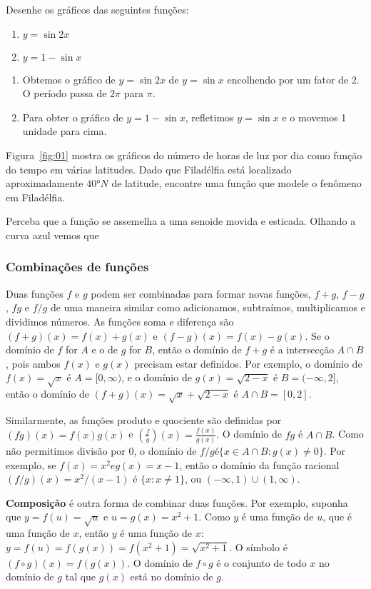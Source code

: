  Desenhe os gráficos das seguintes funções:
\begin{enumerate}
	\item $y=\sin 2x$
	\item $y=1-\sin x$
\end{enumerate}
\solution 
\begin{enumerate}
	\item Obtemos o gráfico de $y=\sin 2x$ de $y=\sin x$ encolhendo por um fator de 2. O período passa de $2\pi$ para $\pi$.
	\item Para obter o gráfico de $y=1-\sin x$, refletimos $y=\sin x$ e o movemos 1 unidade para cima.
\end{enumerate}

 Figura~\ref{fig:01} mostra os gráficos do número de horas de luz por dia como função do tempo em várias latitudes. Dado que Filadélfia está localizado aproximadamente $40\si\degree N$ de latitude, encontre uma função que modele o fenômeno em Filadélfia.

\solution Perceba que a função se assemelha a uma senoide movida e esticada. Olhando a curva azul vemos que 

\subsubsection{Combinações de funções}

Duas funções $f$ e $g$ podem ser combinadas para formar novas funções, $f+g$, $f-g$, $fg$ e $f/g$ de uma maneira similar como adicionamos, subtraímos, multiplicamos e dividimos números. As funções soma e diferença são $(f+g)(x) = f(x)+g(x)$ e $(f-g)(x)=f(x)-g(x)$. Se o domínio de $f$ for $A$ e o de $g$ for $B$, então o domínio de $f+g$ é a intersecção $A\cap B$, pois ambos $f(x)$ e $g(x)$ precisam estar definidos. Por exemplo, o domínio de $f(x) = \sqrt{x}$ é $A=[0,\infty)$, e o domínio de $g(x) = \sqrt{2-x}$ é $B=(-\infty, 2]$, então o domínio de $(f+g)(x)=\sqrt{x}+ \sqrt{2-x}$ é $A\cap B=[0,2]$.

Similarmente, as funções produto e quociente são definidas por $(fg)(x)=f(x)g(x)$ e $\displaystyle\left(\frac{f}{g}\right)(x)=\frac{f(x)}{g(x)}$. O domínio de $fg$ é $A\cap B$. Como não permitimos divisão por 0, o domínio de $f/g é \{x\in A\cap B: g(x)\neq 0\}$. Por exemplo, se $f(x)=x^2 e g(x) = x-1$, então o domínio da função racional $(f/g)(x)=x^2/(x-1)$ é $\{x : x\neq 1\}$, ou $(-\infty, 1) \cup (1, \infty)$.

\textbf{Composição} é outra forma de combinar duas funções. Por exemplo, suponha que $y=f(u)=\sqrt{u}$ e $u = g(x) = x^2+1$. Como $y$ é uma função de $u$, que é uma função de $x$, então $y$ é uma função de $x$: $y=f(u)=f(g(x))=f(x^2+1)=\sqrt{x^2+1}$. O símbolo é $(f\circ g)(x)=f(g(x))$. O domínio de $f\circ g$ é o conjunto de todo $x$ no domínio de $g$ tal que $g(x)$ está no domínio de $g$.

